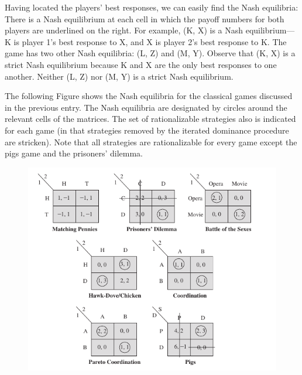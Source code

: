 Having located the players’ best responses, we can easily find the Nash equilibria: There is a Nash equilibrium at each cell in which the payoff numbers for both players are underlined on the right. For example, (K, X) is a Nash equilibrium—K is player 1’s best response to X, and X is player 2’s best response to K. The game has two other Nash equilibria: (L, Z) and (M, Y). Observe that (K, X) is a strict Nash equilibrium because K and X are the only best responses to one another. Neither (L, Z) nor (M, Y) is a strict Nash equilibrium.


The following Figure shows the Nash equilibria for the classical games discussed in the previous entry. The Nash equilibria are designated by circles around the relevant cells of the matrices. The set of rationalizable strategies also is indicated for each game (in that strategies removed by the iterated dominance procedure are stricken). Note that all strategies are rationalizable for every game except the pigs game and the prisoners’ dilemma.

\begin{figure}[H]
    \centering
    \includegraphics[scale=0.5]{images/2023-11-21-game_theory_06.png}
\end{figure}



